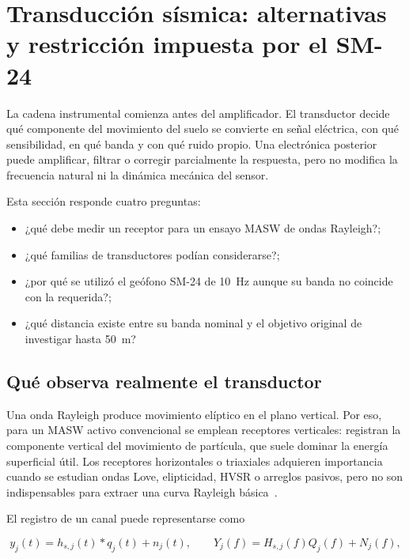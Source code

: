 \section{Transducción sísmica: alternativas y restricción impuesta por el SM-24}
\label{sec:transductores}

La cadena instrumental comienza antes del amplificador. El transductor decide qué
componente del movimiento del suelo se convierte en señal eléctrica, con qué
sensibilidad, en qué banda y con qué ruido propio. Una electrónica posterior puede
amplificar, filtrar o corregir parcialmente la respuesta, pero no modifica la frecuencia
natural ni la dinámica mecánica del sensor.

Esta sección responde cuatro preguntas:

\begin{itemize}
    \item ¿qué debe medir un receptor para un ensayo MASW de ondas Rayleigh?;
    \item ¿qué familias de transductores podían considerarse?;
    \item ¿por qué se utilizó el geófono SM-24 de \SI{10}{\hertz} aunque su banda no
    coincide con la requerida?;
    \item ¿qué distancia existe entre su banda nominal y el objetivo original de
    investigar hasta \SI{50}{\meter}?
\end{itemize}

\subsection{Qué observa realmente el transductor}

Una onda Rayleigh produce movimiento elíptico en el plano vertical. Por eso, para un
MASW activo convencional se emplean receptores verticales: registran la componente
vertical del movimiento de partícula, que suele dominar la energía superficial útil.
Los receptores horizontales o triaxiales adquieren importancia cuando se estudian ondas
Love, elipticidad, HVSR o arreglos pasivos, pero no son indispensables para extraer una
curva Rayleigh básica~\cite{Foti2014,Park1999}.

El registro de un canal puede representarse como

\begin{equation}
    y_j(t)=h_{s,j}(t)*q_j(t)+n_j(t),
    \qquad
    Y_j(f)=H_{s,j}(f)Q_j(f)+N_j(f),
    \label{eq:transductor-medicion}
\end{equation}


